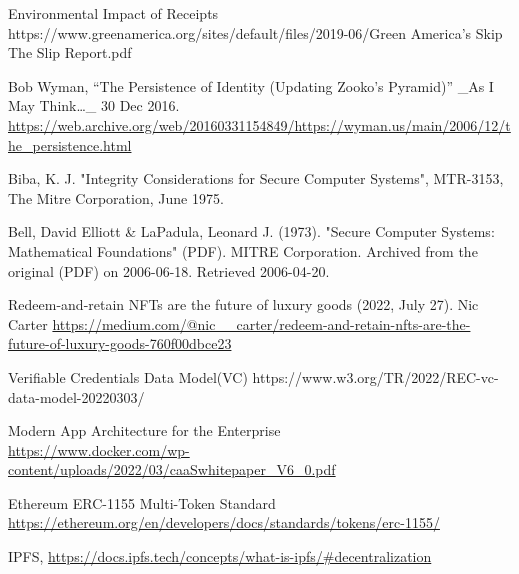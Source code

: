 \documentclass[a4paper,onecolumn, 10.5pt]{article}
\begin{document}
\newpage
\begin{thebibliography}{9}
	 
	Environmental Impact of Receipts https://www.greenamerica.org/sites/default/files/2019-06/Green America’s Skip The Slip Report.pdf 
	
	Bob Wyman, “The Persistence of Identity (Updating Zooko's Pyramid)” \_As I May Think…\_ 30 Dec 2016. \url{https://web.archive.org/web/20160331154849/https://wyman.us/main/2006/12/the_persistence.html}	
	
	Biba, K. J. "Integrity Considerations for Secure Computer Systems", MTR-3153, The Mitre Corporation, June 1975.
	
	Bell, David Elliott \& LaPadula, Leonard J. (1973). "Secure Computer Systems: Mathematical Foundations" (PDF). MITRE Corporation. Archived from the original (PDF) on 2006-06-18. Retrieved 2006-04-20.
	
	Redeem-and-retain NFTs are the future of luxury goods (2022, July 27). Nic Carter
	\url{https://medium.com/@nic__carter/redeem-and-retain-nfts-are-the-future-of-luxury-goods-760f00dbce23}

	Verifiable Credentials Data Model(VC) https://www.w3.org/TR/2022/REC-vc-data-model-20220303/

	Modern App Architecture for the Enterprise \\
	\url{https://www.docker.com/wp-content/uploads/2022/03/caaSwhitepaper_V6_0.pdf}

	Ethereum ERC-1155 Multi-Token Standard \\ \url{https://ethereum.org/en/developers/docs/standards/tokens/erc-1155/}

   IPFS, \url{https://docs.ipfs.tech/concepts/what-is-ipfs/#decentralization}
	

	
\end{thebibliography}
	
\end{document}
